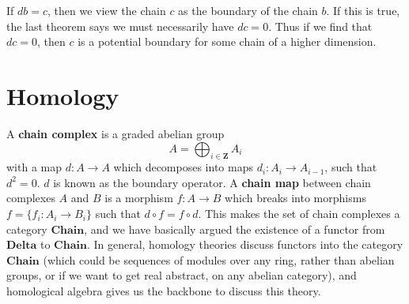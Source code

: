 If $db = c$, then we view the chain $c$ as the boundary of the chain $b$. If this is true, the last theorem says we must necessarily have $dc = 0$. Thus if we find that $dc = 0$, then $c$ is a potential boundary for some chain of a higher dimension.

\section{Homology}

A {\bf chain complex} is a graded abelian group
%
\[ A = \bigoplus_{i \in \mathbf{Z}} A_i \]
%
with a map $d: A \to A$ which decomposes into maps $d_i: A_i \to A_{i-1}$, such that $d^2 = 0$. $d$ is known as the boundary operator. A {\bf chain map} between chain complexes $A$ and $B$ is a morphism $f: A \to B$ which breaks into morphisms $f = \{ f_i : A_i \to B_i \}$ such that $d \circ f = f \circ d$. This makes the set of chain complexes a category $\textbf{Chain}$, and we have basically argued the existence of a functor from $\textbf{Delta}$ to $\textbf{Chain}$. In general, homology theories discuss functors into the category $\textbf{Chain}$ (which could be sequences of modules over any ring, rather than abelian groups, or if we want to get real abstract, on any abelian category), and homological algebra gives us the backbone to discuss this theory.

